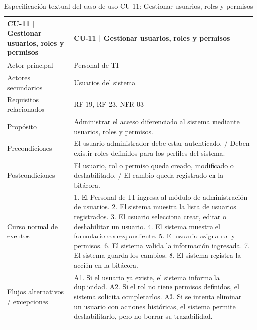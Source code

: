 \begingroup
\small
\begin{longtable}{|p{7.8cm}|p{7.8cm}|}
\hline
CU-11 | Gestionar usuarios, roles y permisos & CU-11 | Gestionar usuarios, roles y permisos \\ \hline
Actor principal & Personal de TI \\ \hline
Actores secundarios & Usuarios del sistema \\ \hline
Requisitos relacionados & RF-19, RF-23, NFR-03 \\ \hline
Propósito & Administrar el acceso diferenciado al sistema mediante usuarios, roles y permisos. \\ \hline
Precondiciones & El usuario administrador debe estar autenticado. / Deben existir roles definidos para los perfiles del sistema. \\ \hline
Postcondiciones & El usuario, rol o permiso queda creado, modificado o deshabilitado. / El cambio queda registrado en la bitácora. \\ \hline
Curso normal de eventos & 1. El Personal de TI ingresa al módulo de administración de usuarios. 2. El sistema muestra la lista de usuarios registrados. 3. El usuario selecciona crear, editar o deshabilitar un usuario. 4. El sistema muestra el formulario correspondiente. 5. El usuario asigna rol y permisos. 6. El sistema valida la información ingresada. 7. El sistema guarda los cambios. 8. El sistema registra la acción en la bitácora. \\ \hline
Flujos alternativos / excepciones & A1. Si el usuario ya existe, el sistema informa la duplicidad. A2. Si el rol no tiene permisos definidos, el sistema solicita completarlos. A3. Si se intenta eliminar un usuario con acciones históricas, el sistema permite deshabilitarlo, pero no borrar su trazabilidad. \\ \hline
\caption{Especificación textual del caso de uso CU-11: Gestionar usuarios, roles y permisos}
\end{longtable}
\endgroup

